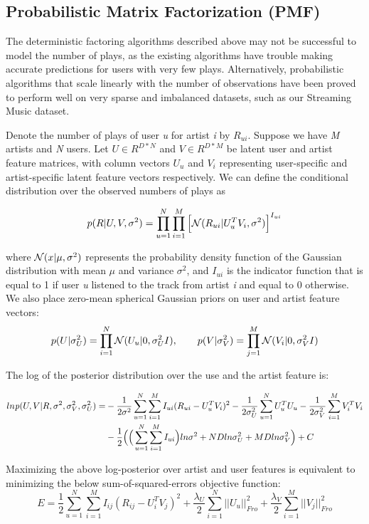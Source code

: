 \documentclass[11pt]{article}
\theoremstyle{definition}
\begin{document}
\subsection{Probabilistic Matrix Factorization (PMF)}
The deterministic factoring algorithms described above may not be  successful to model the number of plays, as the existing algorithms have trouble making accurate predictions for users with very few plays. Alternatively, probabilistic algorithms that scale linearly with the number of observations have been proved to perform well on very sparse and imbalanced datasets, such as our Streaming Music dataset.


Denote the number of plays of user \textit{u} for artist \textit{i} by $R_{ui}$. Suppose we have \textit{M} artists and \textit{N} users. Let $U \in R^{D*N}$ and $V \in R^{D*M}$ be latent user and artist feature matrices, with column vectors $U_u$ and $V_i$ representing user-specific and artist-specific latent feature vectors respectively. We can define the conditional distribution over the observed numbers of plays as

$$p(R|U, V, \sigma^2) = \prod_{u=1}^{N} \prod_{i=1}^M \Big[{\cal N}(R_{ui}|U_u^TV_i,\sigma^2) \Big]^{I_{ui}}$$


where ${\cal N}(x|\mu,\sigma^2)$ represents the probability density function of the Gaussian distribution with mean $\mu$ and variance $\sigma^2$, and $I_{ui}$ is the indicator function that is equal to 1 if user \textit{u} listened to the track from artist \textit{i} and equal to 0 otherwise. We also place zero-mean spherical Gaussian priors on user and artist feature vectors:
$$p(U|\sigma_U^2) = \prod_{i=1}^N {\cal N}(U_u|0,\sigma_U^2 I), \qquad 
p(V|\sigma_V^2)  = \prod_{j=1}^M {\cal N}(V_i|0,\sigma_V^2 I)$$

The log of the posterior distribution over the use and the artist feature is:

\begin{align*}
ln{\it{p}}(U,V|R,\sigma^2,\sigma_V^2,\sigma_U^2) =& 
-\frac{1}{2\sigma^2}\sum_{u=1}^N \sum_{i=1}^M I_{ui}(R_{ui} - U_u^TV_i)^2
-\frac{1}{2\sigma_U^2} \sum_{u=1}^N U_u^TU_u-\frac{1}{2\sigma_V^2}\sum_{i=1}^M V_i^TV_i 
\\
& -\frac{1}{2} \Big( \Big(\sum_{u=1}^N\sum_{i=1}^M I_{ui} \Big) ln\sigma^2 + NDln\sigma_U^2 + MDln\sigma_V^2 \Big) + C
\end{align*}

Maximizing the above log-posterior over artist and user features is equivalent to minimizing the below sum-of-squared-errors objective function:
$$E = \frac{1}{2}\sum_{u=1}^N \sum_{i=1}^M I_{ij}(R_{ij}-U_i^TV_j)^2 + \frac{\lambda_U}{2} \sum_{i=1}^N ||U_u||_{Fro}^2 + \frac{\lambda_V}{2} \sum_{i=1}^M||V_j||_{Fro}^2$$
\end{document}
